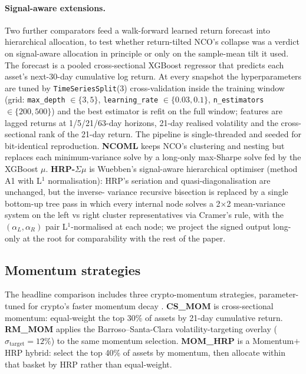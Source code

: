 \documentclass[11pt,a4paper]{article}
\begin{document}
\paragraph{Signal-aware extensions.} Two further comparators feed a
walk-forward learned return forecast into hierarchical allocation, to
test whether return-tilted NCO's collapse was a verdict on signal-aware
allocation in principle or only on the sample-mean tilt it used. The
forecast is a pooled cross-sectional XGBoost regressor that predicts
each asset's next-30-day cumulative log return. At every snapshot the
hyperparameters are tuned by \texttt{TimeSeriesSplit}(3) cross-validation
inside the training window (grid: \texttt{max\_depth} $\in\{3,5\}$,
\texttt{learning\_rate} $\in\{0.03, 0.1\}$, \texttt{n\_estimators}
$\in\{200, 500\}$) and the best estimator is refit on the full window;
features are lagged returns at 1/5/21/63-day horizons, 21-day realised
volatility and the cross-sectional rank of the 21-day return. The
pipeline is single-threaded and seeded for bit-identical reproduction.
\textbf{NCOML} keeps NCO's clustering and nesting but replaces each
minimum-variance solve by a long-only max-Sharpe solve fed by the
XGBoost $\mu$. \textbf{HRP-$\Sigma\mu$} is Wuebben's signal-aware
hierarchical optimiser (method A1 with L$^1$ normalisation): HRP's
seriation and quasi-diagonalisation are unchanged, but the inverse-
variance recursive bisection is replaced by a single bottom-up tree pass
in which every internal node solves a 2$\times$2 mean-variance system on
the left vs right cluster representatives via Cramer's rule, with the
$(\alpha_L,\alpha_R)$ pair L$^1$-normalised at each node; we project the
signed output long-only at the root for comparability with the rest of
the paper.

\subsection{Momentum strategies}
\label{sec:methods-mom}

The headline comparison includes three crypto-momentum strategies,
parameter-tuned for crypto's faster momentum decay
\citep{liu2022cryptofactors}. \textbf{CS\_MOM} is cross-sectional
momentum: equal-weight the top 30\% of assets by 21-day cumulative
return. \textbf{RM\_MOM} applies the Barroso--Santa-Clara
volatility-targeting overlay \citep{barroso2015momentum}
($\sigma_{\text{target}}=12\%$) to the same momentum selection.
\textbf{MOM\_HRP} is a Momentum$+$HRP hybrid: select the top 40\% of
assets by momentum, then allocate within that basket by HRP rather than
equal-weight.
\end{document}
